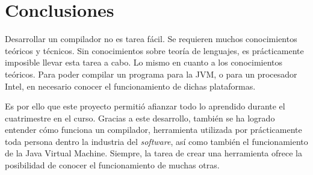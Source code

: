 \documentclass{article}
\begin{document}
    \section{Conclusiones}
    \par Desarrollar un compilador no es tarea fácil. Se requieren muchos conocimientos teóricos y técnicos. Sin conocimientos sobre teoría de lenguajes, es prácticamente imposible llevar esta tarea a cabo. Lo mismo en cuanto a los conocimientos teóricos. Para poder compilar un programa para la JVM, o para un procesador Intel, en necesario conocer el funcionamiento de dichas plataformas.
    \par Es por ello que este proyecto permitió afianzar todo lo aprendido durante el cuatrimestre en el curso. Gracias a este desarrollo, también se ha logrado entender cómo funciona un compilador, herramienta utilizada por prácticamente toda persona dentro la industria del \textit{software}, así como también el funcionamiento de la Java Virtual Machine. Siempre, la tarea de crear una herramienta ofrece la posibilidad de conocer el funcionamiento de muchas otras.
    \clearpage
\end{document}
